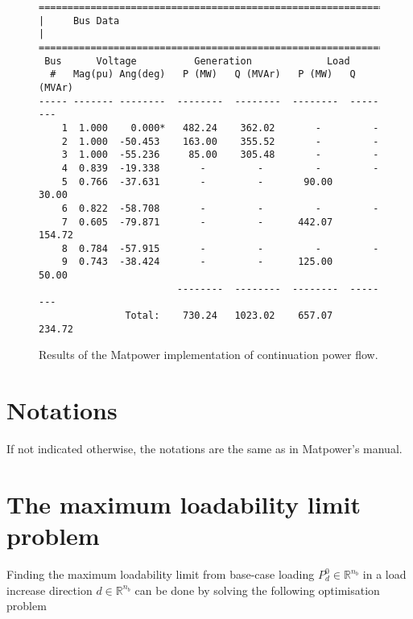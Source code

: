 \documentclass[12pt,a4]{article}
\newcommand*{\field}[1]{\mathbb{#1}}
\newcommand*{\R}{\field{R}} %
\newcommand*{\matpower}{{\sc Matpower}}
\begin{document}
\begin{figure}[!h]
  \centering
\begin{verbatim}
================================================================================
|     Bus Data                                                                 |
================================================================================
 Bus      Voltage          Generation             Load        
  #   Mag(pu) Ang(deg)   P (MW)   Q (MVAr)   P (MW)   Q (MVAr)
----- ------- --------  --------  --------  --------  --------
    1  1.000    0.000*   482.24    362.02       -         -   
    2  1.000  -50.453    163.00    355.52       -         -   
    3  1.000  -55.236     85.00    305.48       -         -   
    4  0.839  -19.338       -         -         -         -   
    5  0.766  -37.631       -         -       90.00     30.00 
    6  0.822  -58.708       -         -         -         -   
    7  0.605  -79.871       -         -      442.07    154.72 
    8  0.784  -57.915       -         -         -         -   
    9  0.743  -38.424       -         -      125.00     50.00 
                        --------  --------  --------  --------
               Total:    730.24   1023.02    657.07    234.72
\end{verbatim}  
  \caption{Results of the \matpower{} implementation of continuation power flow.}\label{fig:res-ieee9-cpf}
\end{figure}

\section{Notations}
\label{sec:notations}

If not indicated otherwise, the notations are the same as in \matpower's manual.

\section{The maximum loadability limit problem}
\label{sec:maxim-load-limit}

Finding the maximum loadability limit from base-case loading $P_d^0 \in \R^{n_b}$ in a load increase direction $d \in \R^{n_b}$ can be done by solving the following optimisation problem
\end{document}
